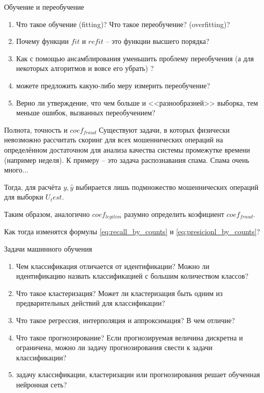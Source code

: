 \documentclass{beamer}
\begin{document}
  	\begin{frame}{Обучение и переобучение}
  		\begin{enumerate}
  			\item Что такое обучение (fitting)? Что такое переобучение? (overfitting)?
  			\item Почему функции $fit$ и $refit$ -- это функции высшего порядка?
  			\item Как с помощью ансамблирования уменьшить проблему переобучения (а для некоторых алгоритмов и вовсе его убрать) ?
  			\item можете предложить какую-либо меру измерить переобучение?
  			\item Верно ли утверждение, что чем больше и <<разнообразней>> выборка, тем меньше ошибок, вызванных переобучением?
  		\end{enumerate} 
	\end{frame}
  	
  	\begin{frame}{Полнота, точность и $coef_{fraud}$}
  		Существуют задачи, в которых физически невозможно рассчитать скоринг для всех 
  		мошеннических операций на определённом достаточном для анализа качества системы промежутке времени (например неделя).
  		К примеру -- это задача распознавания спама. Спама очень много...
  		
  		Тогда, для расчёта ${y, \hat y}$ выбирается лишь подмножество мошеннических операций для выборки $U_test$.
  		
  		Таким образом, аналогично $coef_{legitim}$ разумно определить коэфициент $coef_{fraud}$.
  		
  		Как тогда изменятся формулы \eqref{eq:recall_by_counts} и \eqref{eq:presicionl_by_counts}?
  		
  	\end{frame}
  
  	\begin{frame}{Задачи машинного обучения}
	\begin{enumerate}
		\item Чем классификация отличается от идентификации? Можно ли идентификацию назвать классификацией с большим количеством классов?
		\item Что такое кластеризация? Может ли кластеризация быть одним из предварительных действий для классификации? 
		\item Что такое регрессия, интерполяция и аппроксимация? В чем отличие?
		\item Что такое прогнозирование? Если прогнозируемая величина дискретна и ограничена, можно ли задачу прогнозирования свести к задачи классификации?
		\item задачу классификации, кластеризации или прогнозирования решает обученная нейронная сеть?	
	\end{enumerate}  	  	
	
	\end{frame}
  
\end{document}
